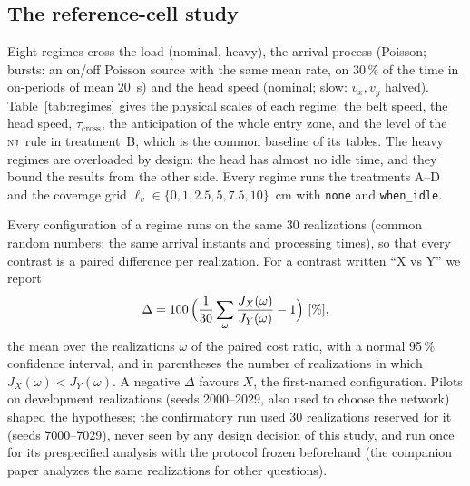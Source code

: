 \documentclass[11pt,a4paper]{article}
\newcommand{\nj}{\textsc{nj}}
\newcommand{\tcross}{\tau_{\mathrm{cross}}}
\newcommand{\lv}{\ell_{v}}
\begin{document}
\subsection{The reference-cell study}\label{sec:refdesign}
Eight regimes cross the load (nominal, heavy), the arrival process (Poisson; bursts: an
on/off Poisson source with the same mean rate, on 30\,\% of the time in on-periods of mean
20~s) and the head speed (nominal; slow: $v_x,v_y$ halved). Table~\ref{tab:regimes} gives
the physical scales of each regime: the belt speed, the head speed, $\tcross$, the
anticipation of the whole entry zone, and the level of the \nj\ rule in treatment~B, which
is the common baseline of its tables. The heavy regimes are overloaded by design: the
head has almost no idle time, and they bound the results from the other side. Every
regime runs the treatments A--D and the coverage grid $\lv\in\{0,1,2.5,5,7.5,10\}$~cm
with \texttt{none} and \texttt{when\_idle}.

\begin{table}[t]
\centering\small
\caption{Reference-cell regimes and physical scales. $\tcross$ is the head's travel time
across the conveyors; the entry zone is given in seconds of belt travel; parts, penalized
flow time, blocking events and blocked conveyor-seconds are means per episode for \nj\ in
B over the 30 realizations (seeds 7000--7029, shared with the companion paper).}
\label{tab:regimes}
\resizebox{\linewidth}{!}{}
\end{table}

Every configuration of a regime runs on the same 30 realizations (common random numbers:
the same arrival instants and processing times), so that every contrast is a paired
difference per realization. For a contrast written ``X vs Y'' we report
\[
\Delta=100\,\Bigl(\frac{1}{30}\sum_{\omega}\frac{J_X(\omega)}{J_Y(\omega)}-1\Bigr)\ [\%],
\]
the mean over the realizations $\omega$ of the paired cost ratio, with a normal 95\,\%
confidence interval, and in parentheses the number of realizations in which
$J_X(\omega)<J_Y(\omega)$. A negative $\Delta$ favours $X$, the first-named
configuration. Pilots on development realizations (seeds 2000--2029, also used to choose
the network) shaped the hypotheses; the confirmatory run used 30 realizations reserved for
it (seeds 7000--7029), never seen by any design decision of this study, and run once for
its prespecified analysis with the protocol frozen beforehand (the companion paper
analyzes the same realizations for other questions).
\end{document}
